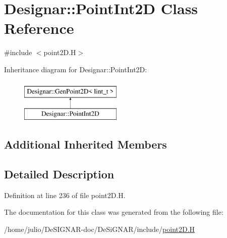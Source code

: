 \hypertarget{class_designar_1_1_point_int2_d}{}\section{Designar\+:\+:Point\+Int2D Class Reference}
\label{class_designar_1_1_point_int2_d}


{\ttfamily \#include $<$point2\+D.\+H$>$}

Inheritance diagram for Designar\+:\+:Point\+Int2D\+:\begin{figure}[H]
\begin{center}
\leavevmode
\includegraphics[height=2.000000cm]{class_designar_1_1_point_int2_d}
\end{center}
\end{figure}
\subsection*{Additional Inherited Members}


\subsection{Detailed Description}


Definition at line 236 of file point2\+D.\+H.



The documentation for this class was generated from the following file\+:\begin{DoxyCompactItemize}
\item 
/home/julio/\+De\+S\+I\+G\+N\+A\+R-\/doc/\+De\+Si\+G\+N\+A\+R/include/\hyperlink{point2_d_8_h}{point2\+D.\+H}\end{DoxyCompactItemize}
